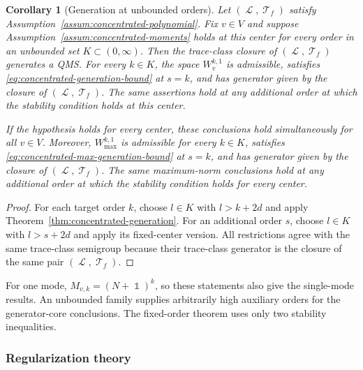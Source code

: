 \documentclass[11pt]{article}
\theoremstyle{myplain}
\newtheorem{cor}[cor]{Corollary}
\theoremstyle{mydefinition}
\theoremstyle{remark}
\DeclareMathOperator{\cL}{\mathcal{L}}
\DeclareMathOperator{\cT}{\mathcal{T}}
\DeclareMathOperator{\1}{\mathds{1}}
\begin{document}
        \begin{cor}[Generation at unbounded orders]\label{cor:concentrated-generation-unbounded}
            Let $(\cL,\cT_f)$ satisfy Assumption~\ref{assum:concentrated-polynomial}. Fix $v\in V$ and suppose Assumption~\ref{assum:concentrated-moments} holds at this center for every order in an unbounded set $K\subset(0,\infty)$. Then the trace-class closure of $(\cL,\cT_f)$ generates a QMS. For every $k\in K$, the space $W_v^{k,1}$ is admissible, satisfies \eqref{eq:concentrated-generation-bound} at $s=k$, and has generator given by the closure of $(\cL,\cT_f)$. The same assertions hold at any additional order at which the stability condition holds at this center.

            If the hypothesis holds for every center, these conclusions hold simultaneously for all $v\in V$. Moreover, $W_{\max}^{k,1}$ is admissible for every $k\in K$, satisfies \eqref{eq:concentrated-max-generation-bound} at $s=k$, and has generator given by the closure of $(\cL,\cT_f)$. The same maximum-norm conclusions hold at any additional order at which the stability condition holds for every center.
        \end{cor}
        \begin{proof}
            For each target order $k$, choose $l\in K$ with $l>k+2d$ and apply Theorem~\ref{thm:concentrated-generation}. For an additional order $s$, choose $l\in K$ with $l>s+2d$ and apply its fixed-center version. All restrictions agree with the same trace-class semigroup because their trace-class generator is the closure of the same pair $(\cL,\cT_f)$.
        \end{proof}

        For one mode, $M_{v,k}=(N+\1)^k$, so these statements also give the single-mode results. An unbounded family supplies arbitrarily high auxiliary orders for the generator-core conclusions. The fixed-order theorem uses only two stability inequalities.
        

        \subsubsection{Regularization theory}
\end{document}
